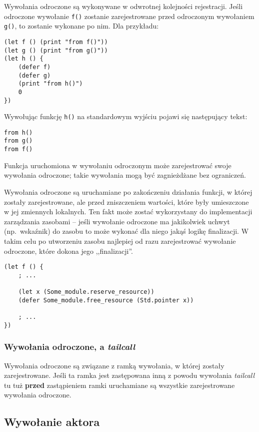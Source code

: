 Wywołania odroczone są wykonywane w odwrotnej kolejności rejestracji. Jeśli odroczone wywołanie \texttt{f()}
zostanie zarejestrowane przed odroczonym wywołaniem \texttt{g()}, to zostanie wykonane po nim. Dla przykładu:
\begin{lstlisting}
(let f () (print "from f()"))
(let g () (print "from g()"))
(let h () {
    (defer f)
    (defer g)
    (print "from h()")
    0
})
\end{lstlisting}

Wywołując funkcję \texttt{h()} na standardowym wyjściu pojawi się następujący tekst:
\begin{lstlisting}
from h()
from g()
from f()
\end{lstlisting}

Funkcja uruchomiona w wywołaniu odroczonym może zarejestrować swoje wywołania
odroczone; takie wywołania mogą być zagnieżdżane bez ograniczeń.

Wywołania odroczone są uruchamiane po zakończeniu działania funkcji, w której
zostały zarejestrowane, ale przed zniszczeniem wartości, które były umieszczone
w jej zmiennych lokalnych. Ten fakt może zostać wykorzystany do implementacji
zarządzania zasobami -- jeśli wywołanie odroczone ma jakikolwiek uchwyt
(np.~wskaźnik) do zasobu to może wykonać dla niego jakąś logikę finalizacji.
W takim celu po utworzeniu zasobu najlepiej od razu zarejestrować wywołanie
odroczone, które dokona jego ,,finalizacji''.

\begin{lstlisting}
(let f () {
    ; ...

    (let x (Some_module.reserve_resource))
    (defer Some_module.free_resource (Std.pointer x))

    ; ...
})
\end{lstlisting}

\subsubsection{Wywołania odroczone, a \emph{tailcall}}

Wywołania odroczone są związane z ramką wywołania, w której zostały
zarejestrowane. Jeśli ta ramka jest zastępowana inną z powodu wywołania
\emph{tailcall} tu tuż \textbf{przed} zastąpieniem ramki uruchamiane są
wszystkie zarejestrowane wywołania odroczone.

\subsection{Wywołanie aktora}
\label{viuact_spec_actor_call}

